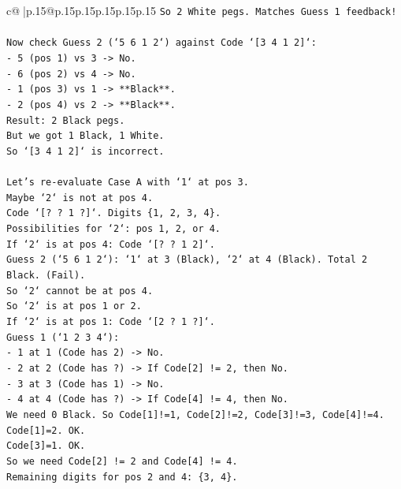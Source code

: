 \documentclass{article}
\begin{document}
{\begin{supertabular}{c@{$\;$}|p{.15\linewidth}@{}p{.15\linewidth}p{.15\linewidth}p{.15\linewidth}p{.15\linewidth}p{.15\linewidth}}
{{{\texttt{So 2 White pegs. Matches Guess 1 feedback!} \\
\\ 
\texttt{Now check Guess 2 (`5 6 1 2`) against Code `{[}3 4 1 2{]}`:} \\
\texttt{{-} 5 (pos 1) vs 3 {-}> No.} \\
\texttt{{-} 6 (pos 2) vs 4 {-}> No.} \\
\texttt{{-} 1 (pos 3) vs 1 {-}> **Black**.} \\
\texttt{{-} 2 (pos 4) vs 2 {-}> **Black**.} \\
\texttt{Result: 2 Black pegs.} \\
\texttt{But we got 1 Black, 1 White.} \\
\texttt{So `{[}3 4 1 2{]}` is incorrect.} \\
\\ 
\texttt{Let's re{-}evaluate Case A with `1` at pos 3.} \\
\texttt{Maybe `2` is not at pos 4.} \\
\texttt{Code `{[}? ? 1 ?{]}`. Digits \{1, 2, 3, 4\}.} \\
\texttt{Possibilities for `2`: pos 1, 2, or 4.} \\
\texttt{If `2` is at pos 4: Code `{[}? ? 1 2{]}`.} \\
\texttt{Guess 2 (`5 6 1 2`): `1` at 3 (Black), `2` at 4 (Black). Total 2 Black. (Fail).} \\
\texttt{So `2` cannot be at pos 4.} \\
\texttt{So `2` is at pos 1 or 2.} \\
\texttt{If `2` is at pos 1: Code `{[}2 ? 1 ?{]}`.} \\
\texttt{Guess 1 (`1 2 3 4`):} \\
\texttt{{-} 1 at 1 (Code has 2) {-}> No.} \\
\texttt{{-} 2 at 2 (Code has ?) {-}> If Code{[}2{]} != 2, then No.} \\
\texttt{{-} 3 at 3 (Code has 1) {-}> No.} \\
\texttt{{-} 4 at 4 (Code has ?) {-}> If Code{[}4{]} != 4, then No.} \\
\texttt{We need 0 Black. So Code{[}1{]}!=1, Code{[}2{]}!=2, Code{[}3{]}!=3, Code{[}4{]}!=4.} \\
\texttt{Code{[}1{]}=2. OK.} \\
\texttt{Code{[}3{]}=1. OK.} \\
\texttt{So we need Code{[}2{]} != 2 and Code{[}4{]} != 4.} \\
\texttt{Remaining digits for pos 2 and 4: \{3, 4\}.} \\
}}}
\end{supertabular}}
\end{document}
